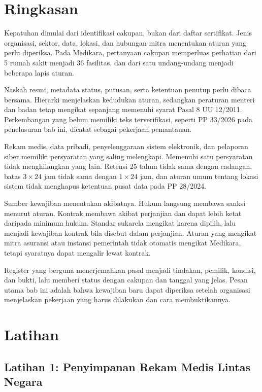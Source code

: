 \section{Ringkasan}

Kepatuhan dimulai dari identifikasi cakupan, bukan dari daftar sertifikat. Jenis organisasi, sektor, data, lokasi, dan
hubungan mitra menentukan aturan yang perlu diperiksa. Pada Medikara, pertanyaan cakupan memperluas perhatian dari 5
rumah sakit menjadi 36 fasilitas, dan dari satu undang-undang menjadi beberapa lapis aturan.

Naskah resmi, metadata status, putusan, serta ketentuan penutup perlu dibaca bersama. Hierarki menjelaskan kedudukan
aturan, sedangkan peraturan menteri dan badan tetap mengikat sepanjang memenuhi syarat Pasal 8 UU 12/2011. Perkembangan
yang belum memiliki teks terverifikasi, seperti PP 33/2026 pada penelusuran bab ini, dicatat sebagai pekerjaan
pemantauan.

Rekam medis, data pribadi, penyelenggaraan sistem elektronik, dan pelaporan siber memiliki persyaratan yang saling
melengkapi. Memenuhi satu persyaratan tidak menghilangkan yang lain. Retensi 25 tahun tidak sama dengan cadangan, batas
$3 \times 24$ jam tidak sama dengan $1 \times 24$ jam, dan aturan umum tentang lokasi sistem tidak menghapus ketentuan
pusat data pada PP 28/2024.

Sumber kewajiban menentukan akibatnya. Hukum langsung membawa sanksi menurut aturan. Kontrak membawa akibat perjanjian dan
dapat lebih ketat daripada minimum hukum. Standar sukarela mengikat karena dipilih, lalu menjadi kewajiban kontrak bila
disebut dalam perjanjian. Aturan yang mengikat mitra asuransi atau instansi pemerintah tidak otomatis mengikat Medikara,
tetapi syaratnya dapat mengalir lewat kontrak.

Register yang berguna menerjemahkan pasal menjadi tindakan, pemilik, kondisi, dan bukti, lalu memberi status dengan
cakupan dan tanggal yang jelas. Pesan utama bab ini adalah bahwa kewajiban baru dapat diperiksa setelah organisasi
menjelaskan pekerjaan yang harus dilakukan dan cara membuktikannya.

\section{Latihan}

\subsection*{Latihan 1: Penyimpanan Rekam Medis Lintas Negara}

